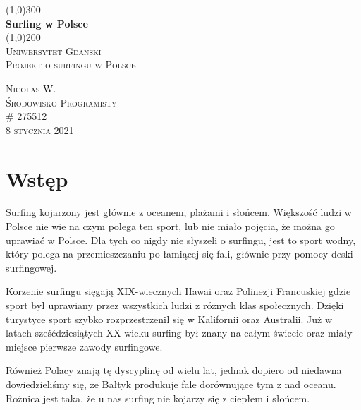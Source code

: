 \documentclass{article}
\begin{document}
\begin{titlepage}
	\begin{center}
	\line(1,0){300} \\
	[0.25in]
	\huge{\bfseries Surfing w Polsce} \\
	[2mm]
	\line(1,0){200} \\
	[1.5cm]
	\textsc{\LARGE Uniwersytet Gdański} \\
	[0.75cm]
	\textsc{\Large Projekt o surfingu w Polsce} \\
	[10cm]
	\end{center}
	\begin{flushright}
	\textsc{\large Nicolas W. \\
	Środowisko Programisty \\ 
	\# 275512 \\
	8 stycznia 2021 \\}
	\end{flushright}
	
	
\end{titlepage} 
\section{Wstęp}\label{sec:intro} 
Surfing kojarzony jest głównie z oceanem, plażami i słońcem. Większość ludzi w Polsce  nie wie na czym polega ten sport, lub nie miało pojęcia, że można go uprawiać w Polsce.
Dla tych co nigdy nie słyszeli o surfingu, jest to sport wodny, który polega na przemieszczaniu po łamiącej się fali, głównie przy pomocy deski surfingowej.


Korzenie surfingu sięgają XIX-wiecznych Hawai oraz Polinezji Francuskiej gdzie sport był uprawiany przez wszystkich ludzi z różnych klas społecznych. Dzięki turystyce sport szybko rozprzestrzenił się w Kalifornii oraz Australii. Już w latach sześćdziesiątych XX wieku surfing był znany na całym świecie oraz miały miejsce pierwsze zawody surfingowe.


Również Polacy znają tę dyscyplinę od wielu lat, jednak dopiero od niedawna dowiedzieliśmy się, że Bałtyk produkuje fale dorównujące tym z nad oceanu. Rożnica jest taka, że u nas surfing nie kojarzy się z ciepłem i słońcem.
\end{document}
